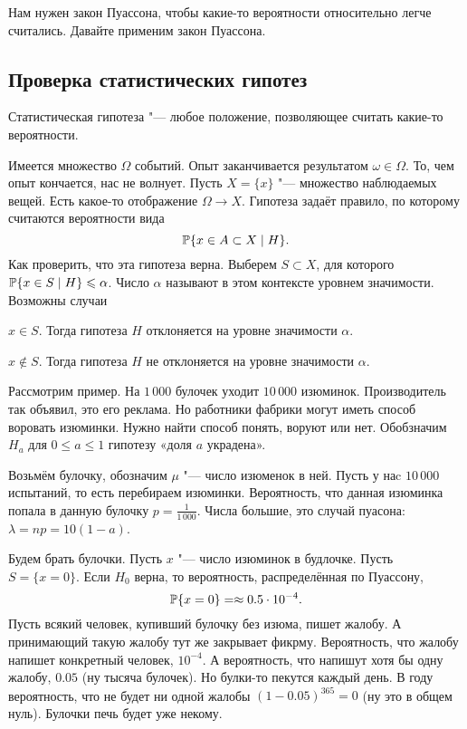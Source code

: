 Нам нужен закон Пуассона, чтобы какие-то вероятности относительно легче считались. Давайте применим закон Пуассона.
\subsection{Проверка статистических гипотез}
Статистическая гипотеза "--- любое положение, позволяющее считать какие-то вероятности.

Имеется множество $\Omega$ событий. Опыт заканчивается результатом $\omega\in \Omega$. То, чем опыт кончается, нас не волнует. Пусть $X=\{x\}$ "--- множество наблюдаемых вещей. Есть какое-то отображение $\Omega\to X$. Гипотеза задаёт правило, по которому считаются вероятности вида
\[
 \P\{x\in A\subset X\mid H\}.
\]
Как проверить, что эта гипотеза верна. Выберем $S\subset X$, для которого $\P\{x\in S\mid H\}\le \alpha$. Число $\alpha$ называют в этом контексте уровнем значимости. Возможны случаи
\begin{roItems}
  \item $x\in S$. Тогда гипотеза $H$ отклоняется на уровне значимости $\alpha$.
  \item $x\not\in S$. Тогда гипотеза $H$ не отклоняется на уровне значимости $\alpha$.
\end{roItems}

Рассмотрим пример. На $1\,000$ булочек уходит $10\,000$ изюминок. Производитель так объявил, это его реклама. Но работники фабрики могут иметь способ воровать изюминки. Нужно найти способ понять, воруют или нет. Обобзначим $H_a$ для $0\le a\le 1$ гипотезу «доля $a$ украдена».

Возьмём булочку, обозначим $\mu$ "--- число изюменок в ней. Пусть у наc $10\,000$ испытаний, то есть перебираем изюминки. Вероятность, что данная изюминка попала в данную булочку $p = \frac1{1\,000}$. Числа большие, это случай пуасона: $\lambda = np = 10(1-a)$.

Будем брать булочки. Пусть $x$ "--- число изюминок в будлочке. Пусть $S=\{x=0\}$. Если $H_0$ верна, то вероятность, распределённая по Пуассону,
\[
  \P\{x=0\}=\approx 0.5\cdot 10^{-4}.
\]
Пусть всякий человек, купивший булочку без изюма, пишет жалобу. А принимающий такую жалобу тут же закрывает фикрму. Вероятность, что жалобу напишет конкретный человек, $10^{-4}$. А вероятность, что напишут хотя бы одну жалобу, $0.05$ (ну тысяча булочек). Но булки-то пекутся каждый день. В году вероятность, что не будет ни одной жалобы $(1-0.05)^{365} = 0$ (ну это в общем нуль). Булочки печь будет уже некому.